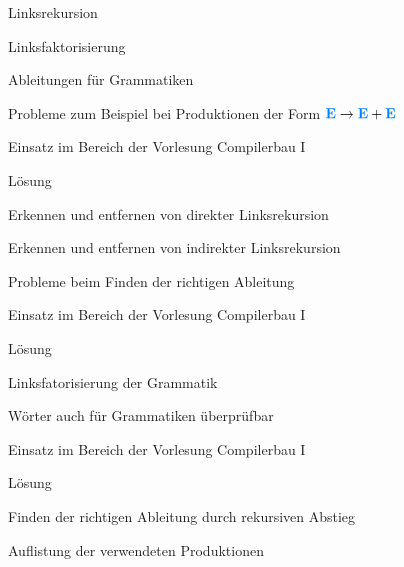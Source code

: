 {
    \begin{itemgroup}{}
	\item Linksrekursion
	\item Linksfaktorisierung
	\item Ableitungen für Grammatiken
    \end{itemgroup}
    
    \vfill{}
}

{
    \begin{itemgroup}{}
	\item Probleme zum Beispiel bei Produktionen der Form $\NonterminalSymbol{E}
	\to \NonterminalSymbol{E} + \NonterminalSymbol{E}$
	\item Einsatz im Bereich der Vorlesung Compilerbau I
    \end{itemgroup}

    \begin{itemgroup}{Lösung}
	\item Erkennen und entfernen von direkter Linksrekursion
	\item Erkennen und entfernen von indirekter Linksrekursion
	\end{itemgroup}
    
    \vfill{}
}

{
    \begin{itemgroup}{}
	\item Probleme beim Finden der richtigen Ableitung
	\item Einsatz im Bereich der Vorlesung Compilerbau I
    \end{itemgroup}

    \begin{itemgroup}{Lösung}
	\item Linksfatorisierung der Grammatik
	\end{itemgroup}
    
    \vfill{}
}

{
    \begin{itemgroup}{}
	\item Wörter auch für Grammatiken überprüfbar
	\item Einsatz im Bereich der Vorlesung Compilerbau I
    \end{itemgroup}

    \begin{itemgroup}{Lösung}
	\item Finden der richtigen Ableitung durch rekursiven Abstieg
	\item Auflistung der verwendeten Produktionen
	\end{itemgroup}
    
    \vfill{}
}


